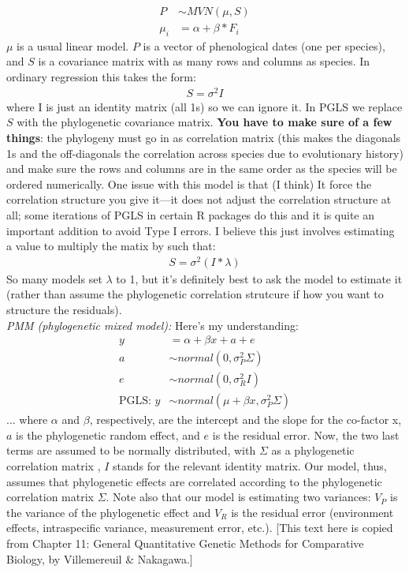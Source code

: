 \documentclass[11pt,letter]{article}
\begin{document}
\begin{align}
P & \sim MVN(\mu, S)\\
\mu_i & = \alpha +  \beta*F_i
\end{align}
$\mu$ is a usual linear model. $P$ is a vector of phenological dates (one per species), and $S$ is a covariance matrix with as many rows and columns as species. In ordinary regression this takes the form:
\begin{align}
S = \sigma^2I
\end{align}
where I is just an identity matrix (all 1s) so we can ignore it. In PGLS we replace $S$ with the phylogenetic covariance matrix. {\bf You have to make sure of a few things}: the phylogeny must go in as correlation matrix (this makes the diagonals 1s and the off-diagonals the correlation across species due to evolutionary history) and make sure the rows and columns are in the same order as the species will be ordered numerically. One issue with this model is that (I think) It force the correlation structure you give it---it does not adjust the correlation structure at all; some iterations of PGLS in certain R packages do this and it is quite an important addition to avoid Type I errors. I believe this just involves estimating a value to multiply the matix by such that:
\begin{align}
S = \sigma^2(I*\lambda)
\end{align}
So many models set $\lambda$ to 1, but it's definitely best to ask the model to estimate it (rather than assume the phylogenetic correlation strutcure if how you want to structure the residuals). \\

\emph{PMM (phylogenetic mixed model):} Here's my understanding:\\

\begin{align}
y & = \alpha + \beta x + a + e\\
a & \sim normal(0, \sigma_P^2\Sigma)\\
e & \sim normal(0, \sigma_R^2I)\\
\text{PGLS: }y & \sim normal(\mu + \beta x, \sigma_P^2\Sigma)
\end{align}
... where $\alpha$ and $\beta$, respectively, are the intercept and the slope for the co-factor x, $a$ is the phylogenetic random effect, and $e$ is the residual error. Now, the two last terms are assumed to be normally distributed, with $\Sigma$ as a phylogenetic correlation matrix , $I$ stands for the relevant identity matrix. Our model, thus, assumes that phylogenetic effects are correlated according to the phylogenetic correlation matrix $\Sigma$. Note also that our model is estimating two variances: $V_P$ is the variance of the phylogenetic effect and $V_R$ is the residual error (environment effects, intraspecific variance, measurement error, etc.). [This text here is copied from Chapter 11: General Quantitative Genetic Methods for Comparative Biology, by Villemereuil \& Nakagawa.]\\
\end{document}
